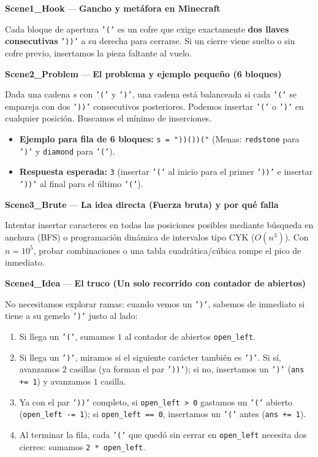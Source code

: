 \documentclass[letterpaper,10pt]{article}
\newcommand{\scene}[2]{\noindent\textbf{\textcolor{mcaqua}{#1}} --- \textbf{#2}\par\vspace{1pt}}
\begin{document}
\begin{shaded}
\scene{Scene1\_Hook}{Gancho y met\'afora en Minecraft}
Cada bloque de apertura \texttt{'('} es un cofre que exige exactamente \textbf{dos llaves consecutivas} \texttt{'))'} a su derecha para cerrarse. Si un cierre viene suelto o sin cofre previo, insertamos la pieza faltante al vuelo.

\scene{Scene2\_Problem}{El problema y ejemplo peque\~no (6 bloques)}
Dada una cadena $s$ con \texttt{'('} y \texttt{')'}, una cadena est\'a balanceada si cada \texttt{'('} se empareja con dos \texttt{'))'} consecutivos posteriores. Podemos insertar \texttt{'('} o \texttt{')'} en cualquier posici\'on. Buscamos el m\'inimo de inserciones.
\begin{itemize}\setlength{\itemsep}{1pt}
  \item \textbf{Ejemplo para fila de 6 bloques:} \texttt{s = "))())("} \quad (Menas: \texttt{redstone} para \texttt{')'} y \texttt{diamond} para \texttt{'('}).
  \item \textbf{Respuesta esperada:} \texttt{3} (insertar \texttt{'('} al inicio para el primer \texttt{'))'} e insertar \texttt{'))'} al final para el \'ultimo \texttt{'('}).
\end{itemize}

\scene{Scene3\_Brute}{La idea directa (Fuerza bruta) y por qu\'e falla}
Intentar insertar caracteres en todas las posiciones posibles mediante b\'usqueda en anchura (BFS) o programaci\'on din\'amica de intervalos tipo CYK ($O(n^3)$). Con $n = 10^5$, probar combinaciones o una tabla cuadr\'atica/c\'ubica rompe el pico de inmediato.

\scene{Scene4\_Idea}{El truco (Un solo recorrido con contador de abiertos)}
No necesitamos explorar ramas: cuando vemos un \texttt{')'}, sabemos de inmediato si tiene a su gemelo \texttt{')'} justo al lado:
\begin{enumerate}\setlength{\itemsep}{1pt}
  \item Si llega un \texttt{'('}, sumamos $1$ al contador de abiertos \texttt{open\_left}.
  \item Si llega un \texttt{')'}, miramos si el siguiente car\'acter tambi\'en es \texttt{')'}. Si s\'i, avanzamos $2$ casillas (ya forman el par \texttt{'))'}); si no, insertamos un \texttt{')'} (\texttt{ans += 1}) y avanzamos $1$ casilla.
  \item Ya con el par \texttt{'))'} completo, si \texttt{open\_left > 0} gastamos un \texttt{'('} abierto (\texttt{open\_left -= 1}); si \texttt{open\_left == 0}, insertamos un \texttt{'('} antes (\texttt{ans += 1}).
  \item Al terminar la fila, cada \texttt{'('} que qued\'o sin cerrar en \texttt{open\_left} necesita dos cierres: sumamos \texttt{2 * open\_left}.
\end{enumerate}


\end{shaded}
\end{document}
